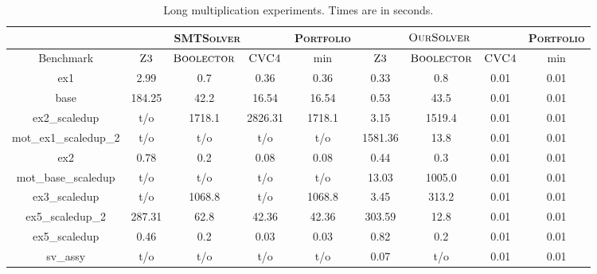 \begin{table}[t]
\centering
\caption{Long multiplication experiments. Times are in seconds.}
\label{my-label}
\begin{tabular}{|c|c|c|c|c|c|c|c|c|}
\hline
                      & \multicolumn{3}{c|}{\textsc{SMTSolver}} & \textsc{Portfolio} & \multicolumn{3}{c|}{$\textsc{OurSolver}$}       & \textsc{Portfolio} \\ \hline
Benchmark             & $\textsc{Z3}$   & $\textsc{Boolector}$  & $\textsc{CVC4}$  & min                  & $\textsc{Z3}$ & $\textsc{Boolector}$ & $\textsc{CVC4}$ & min                  \\ \hline
ex1                   & 2.99        & 0.7           & 0.36        & 0.36                 & 0.33      & 0.8          & 0.01       & 0.01                 \\ \hline
base                  & 184.25      & 42.2          & 16.54       & 16.54                & 0.53      & 43.5         & 0.01       & 0.01                 \\ \hline
ex2\_scaledup         & t/o         & 1718.1        & 2826.31     & 1718.1               & 3.15      & 1519.4       & 0.01       & 0.01                 \\ \hline
mot\_ex1\_scaledup\_2 & t/o         & t/o           & t/o         & t/o                  & 1581.36   & 13.8         & 0.01       & 0.01                 \\ \hline
ex2                   & 0.78        & 0.2           & 0.08        & 0.08                 & 0.44      & 0.3          & 0.01       & 0.01                 \\ \hline
mot\_base\_scaledup   & t/o         & t/o           & t/o         & t/o                  & 13.03     & 1005.0       & 0.01       & 0.01                 \\ \hline
ex3\_scaledup         & t/o         & 1068.8        & t/o         & 1068.8               & 3.45      & 313.2        & 0.01       & 0.01                 \\ \hline
ex5\_scaledup\_2      & 287.31      & 62.8          & 42.36       & 42.36                & 303.59    & 12.8         & 0.01       & 0.01                 \\ \hline
ex5\_scaledup         & 0.46        & 0.2           & 0.03        & 0.03                 & 0.82      & 0.2          & 0.01       & 0.01                 \\ \hline
sv\_assy              & t/o         & t/o           & t/o         & t/o                  & 0.07      & t/o          & 0.01       & 0.01                 \\ \hline

\end{tabular}
\end{table}
